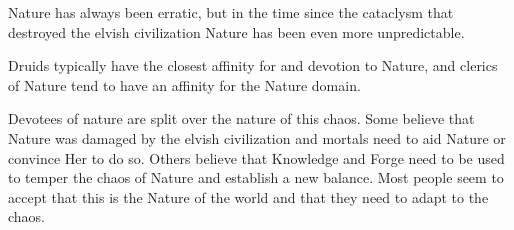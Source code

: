 Nature has always been erratic, but in the time since the cataclysm that destroyed the elvish civilization Nature has been even more unpredictable.

Druids typically have the closest affinity for and devotion to Nature, and clerics of Nature tend to have an affinity for the Nature domain.

Devotees of nature are split over the nature of this chaos.
Some believe that Nature was damaged by the elvish civilization and mortals need to aid Nature or convince Her to do so.
Others believe that Knowledge and Forge need to be used to temper the chaos of Nature and establish a new balance.
Most people seem to accept that this is the Nature of the world and that they need to adapt to the chaos.
